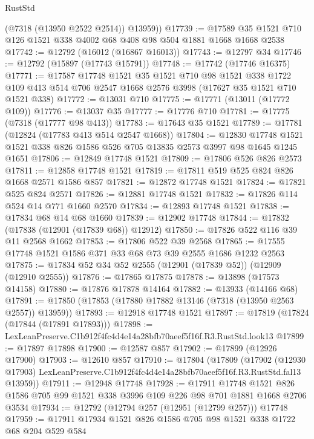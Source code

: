 \begin{lexlean}{RustStd}
\begin{coremodule}
        (@7318 (@13950 @2522 @2514))
        @13959))
@17739 := @17589 @35 @1521 @710 @126 @1521 @338 @4002 @68 @408 @98 @504 @1881 @1668 @1668 @2538
@17742 := @12792 (@16012 (@16867 @16013))
@17743 := @12797 @34
@17746 := @12792 (@15897 (@17743 @15791))
@17748 := @17742 (@17746 @16375)
@17771 := @17587
    @17748
    @1521
    @35
    @1521
    @710
    @98
    @1521
    @338
    @1722
    @109
    @413
    @514
    @706
    @2547
    @1668
    @2576
    @3998
    (@17627 @35 @1521 @710 @1521 @338)
@17772 := @13031 @710
@17775 := @17771 (@13011 (@17772 @109))
@17776 := @13037 @35
@17777 := @17776 @710
@17781 := @17775 (@7318 (@17777 @98 @413))
@17783 := @17643 @35 @1521
@17789 := @17781 (@12824 (@17783 @413 @514 @2547 @1668))
@17804 := @12830
    @17748
    @1521
    @1521
    @338
    @826
    @1586
    @526
    @705
    @13835
    @2573
    @3997
    @98
    @1645
    @1245
    @1651
@17806 := @12849 @17748 @1521
@17809 := @17806 @526 @826 @2573
@17811 := @12858 @17748 @1521
@17819 := @17811 @519 @525 @824 @826 @1668 @2571 @1586 @857
@17821 := @12872 @17748 @1521
@17824 := @17821 @525 @824 @2571
@17826 := @12881 @17748 @1521
@17832 := @17826 @114 @524 @14 @771 @1660 @2570
@17834 := @12893 @17748 @1521
@17838 := @17834 @68 @14 @68 @1660
@17839 := @12902 @17748
@17844 := @17832 (@17838 (@12901 (@17839 @68)) @12912)
@17850 := @17826 @522 @116 @39 @11 @2568 @1662
@17853 := @17806 @522 @39 @2568
@17865 := @17555 @17748 @1521 @1586 @371 @33 @68 @73 @39 @2555 @1686 @1232 @2563
@17875 := @17834 @52 @34 @52 @2555 (@12901 (@17839 @52)) (@12909 (@12910 @2555))
@17876 := @17865 @17875
@17878 := @13898 (@17573 @14158)
@17880 := @17876 @17878 @14164
@17882 := @13933 (@14166 @68)
@17891 := @17850 (@17853 (@17880 @17882 @13146 (@7318 (@13950 @2563 @2557)) @13959))
@17893 := @12918 @17748 @1521
@17897 := @17819 (@17824 (@17844 (@17891 @17893)))
@17898 := LexLeanPreserve.C1b912f4fc4d4e14a28bfb70aeef5f16f.R3.RustStd.look13
@17899 := @17897 @17898
@17900 := @12587 @857
@17902 := @17899 (@12926 @17900)
@17903 := @12610 @857
@17910 := @17804
    (@17809
      (@17902
        (@12930 @17903)
        LexLeanPreserve.C1b912f4fc4d4e14a28bfb70aeef5f16f.R3.RustStd.fal13
        @13959))
@17911 := @12948 @17748
@17928 := @17911
    @17748
    @1521
    @826
    @1586
    @705
    @99
    @1521
    @338
    @3996
    @109
    @226
    @98
    @701
    @1881
    @1668
    @2706
    @3534
@17934 := @12792 (@12794 @257 (@12951 (@12799 @257))) @17748
@17959 := @17911
    @17934
    @1521
    @826
    @1586
    @705
    @98
    @1521
    @338
    @1722
    @68
    @204
    @529
    @584

\end{coremodule}
\end{lexlean}
